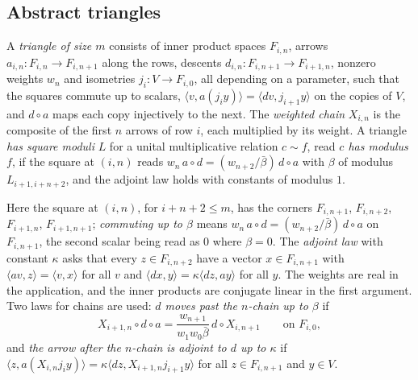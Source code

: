 \subsection{Abstract triangles}\label{ss:triangles}
A \emph{triangle of size $m$} consists of inner product spaces $F_{i,n}$, arrows $a_{i,n}\colon F_{i,n}\to F_{i,n+1}$ along the rows, descents $d_{i,n}\colon F_{i,n+1}\to F_{i+1,n}$, nonzero weights $w_n$ and isometries
$j_i\colon V\to F_{i,0}$, all depending on a parameter, such that the squares commute up to scalars, $\langle v,a(j_iy)\rangle=\langle dv,j_{i+1}y\rangle$ on the copies of $V$, and $d\circ a$ maps each copy injectively to
the next. The \emph{weighted chain} $X_{i,n}$ is the composite of the first $n$ arrows of row $i$, each multiplied by its weight. A triangle \emph{has square moduli} $L$ for a unital multiplicative
relation $c\sim f$, read \emph{$c$ has modulus $f$}, if the square at $(i,n)$ reads $w_n\,a\circ d=(w_{n+2}/\bar\beta)\,d\circ a$ with $\beta$ of modulus $L_{i+1,i+n+2}$, and the adjoint law holds with constants of modulus $1$.

Here the square at $(i,n)$, for $i+n+2\le m$, has the corners $F_{i,n+1}$, $F_{i,n+2}$, $F_{i+1,n}$, $F_{i+1,n+1}$; \emph{commuting up to $\beta$} means $w_n\,a\circ d=(w_{n+2}/\bar\beta)\,d\circ a$ on $F_{i,n+1}$, the second
scalar being read as $0$ where $\beta=0$. The \emph{adjoint law} with constant $\kappa$ asks that every $z\in F_{i,n+2}$ have a vector $x\in F_{i,n+1}$ with $\langle av,z\rangle=\langle v,x\rangle$ for all $v$ and
$\langle dx,y\rangle=\kappa\langle dz,ay\rangle$ for all $y$. The weights are real in the application, and the inner products are conjugate linear in the first argument. Two laws for chains are used:
\emph{$d$ moves past the $n$-chain up to $\beta$} if
\[
  X_{i+1,n}\circ d\circ a=\frac{w_{n+1}}{w_1w_0\bar\beta}\,d\circ X_{i,n+1}\qquad\text{on }F_{i,0},
\]
and \emph{the arrow after the $n$-chain is adjoint to $d$ up to $\kappa$} if $\langle z,a(X_{i,n}j_iy)\rangle=\kappa\langle dz,X_{i+1,n}j_{i+1}y\rangle$ for all $z\in F_{i,n+1}$ and $y\in V$.


